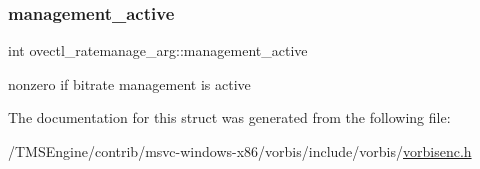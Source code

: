 \subsubsection{\texorpdfstring{management\+\_\+active}{management\_active}}
{\footnotesize\ttfamily int ovectl\+\_\+ratemanage\+\_\+arg\+::management\+\_\+active}

nonzero if bitrate management is active 

The documentation for this struct was generated from the following file\+:\begin{DoxyCompactItemize}
\item 
/\+T\+M\+S\+Engine/contrib/msvc-\/windows-\/x86/vorbis/include/vorbis/\hyperlink{vorbisenc_8h}{vorbisenc.\+h}\end{DoxyCompactItemize}
